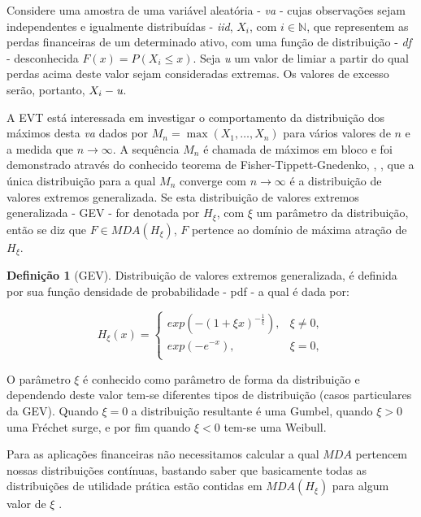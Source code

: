 \documentclass[review]{elsarticle}
\theoremstyle{definition}
\newtheorem{defi}[teor]{Definição}
\begin{document}
Considere uma amostra de uma variável aleatória - \emph{va} - cujas observações sejam independentes e igualmente distribuídas - \emph{iid}, $X_i$, com $i\in \mathbb{N}$, que representem as perdas financeiras de um determinado ativo, com uma função de distribuição - \emph{df} - desconhecida $F(x) = P(X_i \leq x)$.
Seja \emph{u} um valor de limiar a partir do qual perdas acima deste valor sejam consideradas extremas. Os valores de excesso serão, portanto, $X_i - \emph{u}$.

A EVT está interessada em investigar o comportamento da distribuição dos máximos desta \emph{va} dados por $M_n = \max (X_1, \ldots , X_n)$ para vários valores de $n$ e a medida que $n\rightarrow \infty$. A sequência $M_n$ é chamada de máximos em bloco e foi demonstrado através do conhecido teorema de Fisher-Tippett-Gnedenko, \cite{Fisher1928}, \cite{Gnedenko1941, Gnedenko1943}, que a única distribuição para a qual $M_n$ converge com $n\rightarrow \infty$ é a distribuição de valores extremos generalizada. Se esta distribuição de valores extremos generalizada - GEV - for denotada por $H_\xi$, com $\xi$ um parâmetro da distribuição, então se diz que $F \in MDA(H_\xi)$, $F$ pertence ao domínio de máxima atração de $H_\xi$.


\begin{defi}[GEV] \label{defi:GEV}
	Distribuição de valores extremos generalizada, é definida por sua função densidade de probabilidade - pdf - a qual é dada por:
	
	\begin{equation}
	\label{eq:GEV}
	H_\xi(x) = 
	\begin{cases}
	exp(-(1+\xi x)^{-\frac{1}{\xi}}), & \xi \neq 0,\\
	exp(-e^{-x}), & \xi = 0,\\
	\end{cases}
	\end{equation}
\end{defi}

O parâmetro $\xi$ é conhecido como parâmetro de forma da distribuição e dependendo deste valor tem-se diferentes tipos de distribuição (casos particulares da GEV). Quando $\xi=0$ a distribuição resultante é uma Gumbel, quando  $\xi>0$ uma Fréchet surge, e por fim quando $\xi<0$ tem-se uma Weibull.

Para as aplicações financeiras não necessitamos calcular a qual $MDA$ pertencem nossas distribuições contínuas, bastando saber que basicamente todas as distribuições de utilidade prática estão contidas em $MDA(H_\xi)$ para algum valor de $\xi$ \cite[p. ~139]{McNeil2015}.
\end{document}
